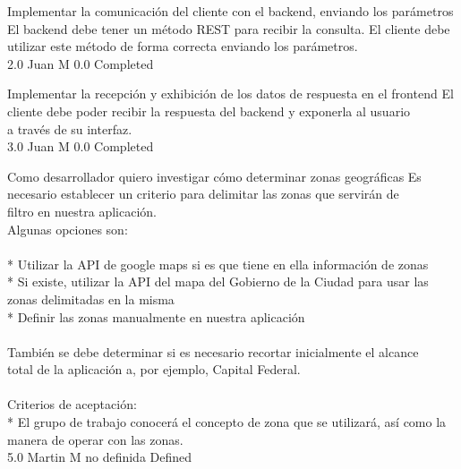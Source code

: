 		{Implementar la comunicación del cliente con el backend, enviando los parámetros} %
		{El backend debe tener un método REST para recibir la consulta. El cliente debe\\
utilizar este método de forma correcta enviando los parámetros.\\
} %
		{2.0} %
		{Juan M} %
		{0.0} %
		{Completed} %

		{Implementar la recepción y exhibición de los datos de respuesta en el frontend} %
		{El cliente debe poder recibir la respuesta del backend y exponerla al usuario\\
a través de su interfaz.\\
} %
		{3.0} %
		{Juan M} %
		{0.0} %
		{Completed} %


\vspace{20pt}

	{Como desarrollador quiero investigar cómo determinar zonas geográficas} %
	{Es necesario establecer un criterio para delimitar las zonas que servirán de\\
filtro en nuestra aplicación.\\
Algunas opciones son:\\
  \\
* Utilizar la API de google maps si es que tiene en ella información de zonas\\
* Si existe, utilizar la API del mapa del Gobierno de la Ciudad para usar las zonas delimitadas en la misma\\
* Definir las zonas manualmente en nuestra aplicación\\
  \\
También se debe determinar si es necesario recortar inicialmente el alcance\\
total de la aplicación a, por ejemplo, Capital Federal.\\
  \\
Criterios de aceptación:\\
* El grupo de trabajo conocerá el concepto de zona que se utilizará, así como la manera de operar con las zonas.  \\
} %
	{} %
	{5.0} %
	{Martin M} %
	{no definida} %
	{Defined} %


